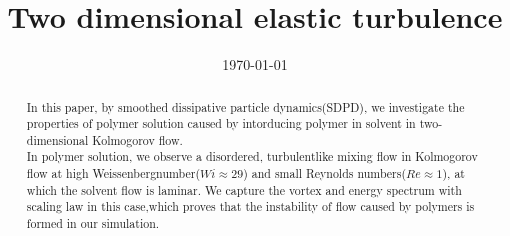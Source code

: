 \documentclass[aps,pre,twocolumn,showpacs,superscriptaddress,groupedaddress]{revtex4}  %
\begin{document}


\title{Two dimensional elastic turbulence}
\date{\today}


\begin{abstract}
In this paper, by smoothed dissipative particle dynamics(SDPD), we investigate the properties of polymer solution caused by intorducing polymer in solvent 
in two-dimensional Kolmogorov flow.\\
In polymer solution, we observe a disordered, turbulentlike mixing flow in
Kolmogorov flow at high Weissenbergnumber($Wi\approx29$) and small Reynolds numbers($Re\approx1$), at which the solvent flow is laminar.
We capture the vortex and energy spectrum with scaling law in this case,which proves that the instability of flow caused by polymers is formed in our simulation.
\end{abstract}

\pacs{}
\maketitle
\end{document}
